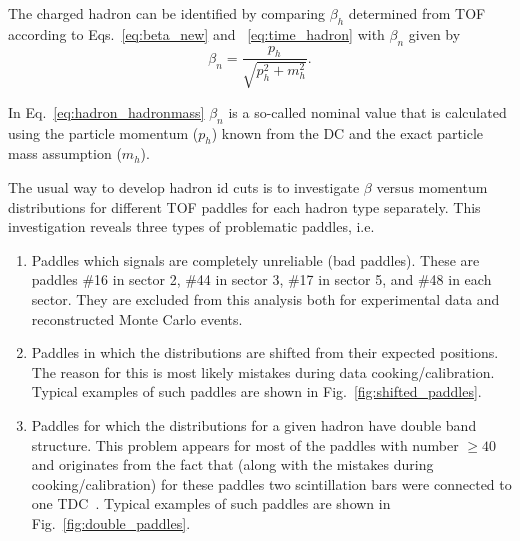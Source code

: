 The charged hadron can be identified by comparing $\beta_{h}$ determined from TOF according to Eqs.~\eqref{eq:beta_new} and ~\eqref{eq:time_hadron} with $\beta_{n}$ given by 
\begin{equation}
\beta_{n}=\frac{p_{h}}{\sqrt{p_{h}^{2}+m_{h}^{2}}}.
\label{eq:hadron_hadronmass}
\end{equation}

In Eq.~\eqref{eq:hadron_hadronmass} $\beta_{n}$ is a so-called nominal value that is calculated using the particle momentum ($p_{h}$) known from the DC and the exact particle mass assumption ($m_{h}$).

The usual way to develop hadron id cuts is to investigate $\beta$ versus momentum distributions for different TOF paddles for each hadron type separately. This investigation reveals three types of problematic paddles, i.e.

\begin{enumerate}[label=\Alph*]\vspace{-0.5em}
\item  Paddles which signals are completely unreliable (bad paddles). These are paddles \#16 in sector 2, \#44 in sector 3, \#17 in sector 5, and \#48 in each sector. They are excluded from this analysis both for experimental data and reconstructed Monte Carlo events. 
\item Paddles in which the distributions are shifted from their expected positions. The reason for this is most likely mistakes during data cooking/calibration. Typical examples of such paddles are shown in Fig.~\ref{fig:shifted_paddles}.
\item Paddles for which the distributions for a given hadron have double band structure. This problem appears for most of the paddles with number $\geq 40$ and originates from the fact that (along with the mistakes during cooking/calibration) for these paddles two scintillation bars were connected to one TDC~\cite{clas_tof_paddles}. Typical examples of such paddles are shown in Fig.~\ref{fig:double_paddles}.
\end{enumerate}

